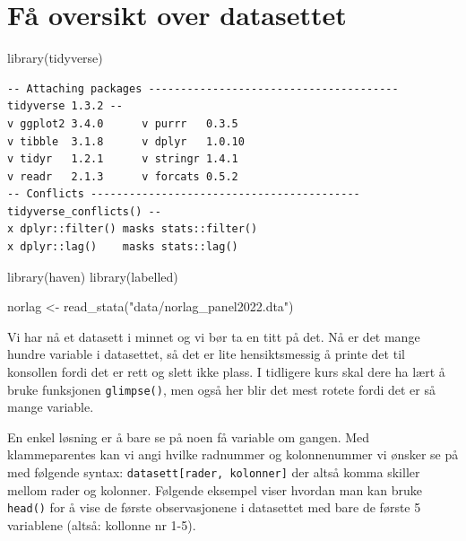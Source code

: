 \documentclass[
  letterpaper,
  DIV=11,
  numbers=noendperiod]{scrreprt}
\newenvironment{Shaded}{\begin{snugshade}}{\end{snugshade}}
\newcommand{\FunctionTok}[1]{\textcolor[rgb]{0.28,0.35,0.67}{#1}}
\newcommand{\NormalTok}[1]{\textcolor[rgb]{0.00,0.23,0.31}{#1}}
\newcommand{\OtherTok}[1]{\textcolor[rgb]{0.00,0.23,0.31}{#1}}
\newcommand{\StringTok}[1]{\textcolor[rgb]{0.13,0.47,0.30}{#1}}
\begin{document}

\hypertarget{fuxe5-oversikt-over-datasettet}{%
\chapter{Få oversikt over
datasettet}\label{fuxe5-oversikt-over-datasettet}}

\begin{Shaded}
\begin{Highlighting}[]
\FunctionTok{library}\NormalTok{(tidyverse)}
\end{Highlighting}
\end{Shaded}

\begin{verbatim}
-- Attaching packages --------------------------------------- tidyverse 1.3.2 --
v ggplot2 3.4.0      v purrr   0.3.5 
v tibble  3.1.8      v dplyr   1.0.10
v tidyr   1.2.1      v stringr 1.4.1 
v readr   2.1.3      v forcats 0.5.2 
-- Conflicts ------------------------------------------ tidyverse_conflicts() --
x dplyr::filter() masks stats::filter()
x dplyr::lag()    masks stats::lag()
\end{verbatim}

\begin{Shaded}
\begin{Highlighting}[]
\FunctionTok{library}\NormalTok{(haven)}
\FunctionTok{library}\NormalTok{(labelled)}
\end{Highlighting}
\end{Shaded}

\begin{Shaded}
\begin{Highlighting}[]
\NormalTok{norlag }\OtherTok{\textless{}{-}} \FunctionTok{read\_stata}\NormalTok{(}\StringTok{"data/norlag\_panel2022.dta"}\NormalTok{)}
\end{Highlighting}
\end{Shaded}

Vi har nå et datasett i minnet og vi bør ta en titt på det. Nå er det
mange hundre variable i datasettet, så det er lite hensiktsmessig å
printe det til konsollen fordi det er rett og slett ikke plass. I
tidligere kurs skal dere ha lært å bruke funksjonen \texttt{glimpse()},
men også her blir det mest rotete fordi det er så mange variable.

En enkel løsning er å bare se på noen få variable om gangen. Med
klammeparentes kan vi angi hvilke radnummer og kolonnenummer vi ønsker
se på med følgende syntax: \texttt{datasett{[}rader,\ kolonner{]}} der
altså komma skiller mellom rader og kolonner. Følgende eksempel viser
hvordan man kan bruke \texttt{head()} for å vise de første
observasjonene i datasettet med bare de første 5 variablene (altså:
kollonne nr 1-5).
\end{document}
